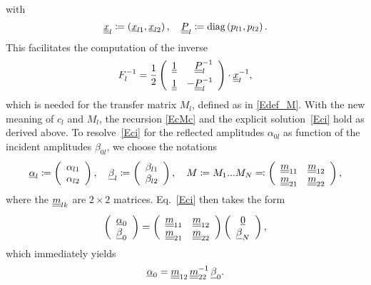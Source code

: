 with
\begin{equation}
  \underline{\underline{x}}_l \coloneqq
  \left(\underline{x}_{l1}, \underline{x}_{l2}\right),
  \quad
  \underline{\underline{P}}_l \coloneqq
  \text{diag}\left(p_{l1},p_{l2}\right).
\end{equation}
This facilitates the computation of the inverse
\begin{equation}
  F_l^{-1}
    = \frac{1}{2}
    \left(\begin{array}{cc}\underline{\underline{1}}&\hphantom{-}\underline{\underline{P}}_l^{-1}\\[1.2ex]
      \underline{\underline{1}} &-\underline{\underline{P}}_l^{-1}\end{array}\right)
      \cdot\underline{\underline{x}}_l^{-1},
\end{equation}
which is needed for the transfer matrix $M_l$,
defined as in \cref{Edef_M}.
With the new meaning of $c_l$ and $M_l$,
the recursion \cref{EcMc} and the explicit solution~\cref{Eci}
hold as derived above.
To resolve~\cref{Eci} for the reflected amplitudes $\alpha_{0l}$
as function of the incident amplitudes $\beta_{0l}$,
we choose the notations
\begin{equation}
  \u\alpha_l
  \coloneqq \left(\begin{array}{c}\alpha_{l1}\\\alpha_{l2}\end{array}\right),\quad
  \u\beta_l
  \coloneqq \left(\begin{array}{c}\beta_{l1}\\\beta_{l2}\end{array}\right),\quad
  M\coloneqq M_1 ... M_N %
  \eqqcolon \left(\begin{array}{cc}\uu m_{11}&\uu m_{12}\\
                           \uu m_{21}&\uu m_{22}\end{array}\right),
\end{equation}
where the $\underline{\underline{m}}_{l k}$ are $2\times2$ matrices.
Eq.~\cref{Eci} then takes the form
\begin{equation}
  \left(\begin{array}{c}\underline{\alpha}_{0}\\\underline{\beta}_{0}\end{array}\right)
  =
  \left(\begin{array}{cc}\underline{\underline{m}}_{11}&\underline{\underline{m}}_{12}\\
    \underline{\underline{m}}_{21}&\underline{\underline{m}}_{22}\end{array}\right)
  \left(\begin{array}{c}\underline{0}\\\underline{\beta}_{N}\end{array}\right),
\end{equation}
which immediately yields
\begin{equation}
  \underline{\alpha}_0 = \underline{\underline{m}}_{12}\,\underline{\underline{m}}_{22}^{-1}\,\underline{\beta}_0.
\end{equation}
